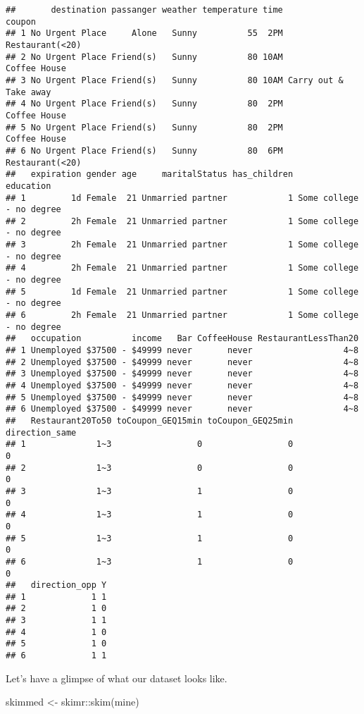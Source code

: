 \documentclass[
]{article}
\newenvironment{Shaded}{\begin{snugshade}}{\end{snugshade}}
\newcommand{\FunctionTok}[1]{\textcolor[rgb]{0.00,0.00,0.00}{#1}}
\newcommand{\NormalTok}[1]{#1}
\newcommand{\OtherTok}[1]{\textcolor[rgb]{0.56,0.35,0.01}{#1}}
\newcommand{\SpecialCharTok}[1]{\textcolor[rgb]{0.00,0.00,0.00}{#1}}
\begin{document}
\begin{verbatim}
##       destination passanger weather temperature time                coupon
## 1 No Urgent Place     Alone   Sunny          55  2PM       Restaurant(<20)
## 2 No Urgent Place Friend(s)   Sunny          80 10AM          Coffee House
## 3 No Urgent Place Friend(s)   Sunny          80 10AM Carry out & Take away
## 4 No Urgent Place Friend(s)   Sunny          80  2PM          Coffee House
## 5 No Urgent Place Friend(s)   Sunny          80  2PM          Coffee House
## 6 No Urgent Place Friend(s)   Sunny          80  6PM       Restaurant(<20)
##   expiration gender age     maritalStatus has_children                education
## 1         1d Female  21 Unmarried partner            1 Some college - no degree
## 2         2h Female  21 Unmarried partner            1 Some college - no degree
## 3         2h Female  21 Unmarried partner            1 Some college - no degree
## 4         2h Female  21 Unmarried partner            1 Some college - no degree
## 5         1d Female  21 Unmarried partner            1 Some college - no degree
## 6         2h Female  21 Unmarried partner            1 Some college - no degree
##   occupation          income   Bar CoffeeHouse RestaurantLessThan20
## 1 Unemployed $37500 - $49999 never       never                  4~8
## 2 Unemployed $37500 - $49999 never       never                  4~8
## 3 Unemployed $37500 - $49999 never       never                  4~8
## 4 Unemployed $37500 - $49999 never       never                  4~8
## 5 Unemployed $37500 - $49999 never       never                  4~8
## 6 Unemployed $37500 - $49999 never       never                  4~8
##   Restaurant20To50 toCoupon_GEQ15min toCoupon_GEQ25min direction_same
## 1              1~3                 0                 0              0
## 2              1~3                 0                 0              0
## 3              1~3                 1                 0              0
## 4              1~3                 1                 0              0
## 5              1~3                 1                 0              0
## 6              1~3                 1                 0              0
##   direction_opp Y
## 1             1 1
## 2             1 0
## 3             1 1
## 4             1 0
## 5             1 0
## 6             1 1
\end{verbatim}

Let's have a glimpse of what our dataset looks like.

\begin{Shaded}
\begin{Highlighting}[]
\NormalTok{skimmed }\OtherTok{\textless{}{-}}\NormalTok{ skimr}\SpecialCharTok{::}\FunctionTok{skim}\NormalTok{(mine)}
\end{Highlighting}
\end{Shaded}
\end{document}
